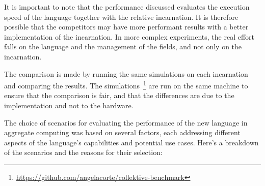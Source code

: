It is important to note that the performance discussed evaluates the execution speed of the language together with
the relative incarnation.
It is therefore possible that the competitors may have more performant results with a better implementation of the incarnation.
In more complex experiments, the real effort falls on the language and the management of the fields, and not only on the incarnation.

The comparison is made by running the same simulations on each incarnation and comparing the results.
The simulations~\footnote{\url{https://github.com/angelacorte/collektive-benchmark}} are run on the same machine to
ensure that the comparison is fair, and that the differences are due to the implementation and not to the hardware.

The choice of scenarios for evaluating the performance of the new language in aggregate computing was based on several
factors, each addressing different aspects of the language's capabilities and potential use cases.
Here's a breakdown of the scenarios and the reasons for their selection:
